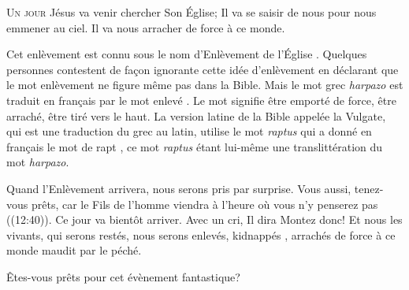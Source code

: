 



\lettrine{U}{n jour} Jésus va venir chercher Son Église;
 Il va se saisir de nous pour nous emmener au ciel.
 Il va nous arracher de force à ce monde.

Cet enlèvement est connu sous le nom \Og d'Enlèvement de l'Église \Fg{}.
 Quelques personnes contestent de fa\c{c}on ignorante cette idée d'enlèvement
 en déclarant que le mot \Og enlèvement \Fg{} ne figure même pas dans la Bible.
 Mais le mot grec \emph{harpazo} est traduit en fran\c{c}ais
 par le mot \Og enlevé \Fg{}. Le mot signifie \Og être emporté de force,
 être arraché, être tiré vers le haut. \Fg{}
 La version latine de la Bible appelée la Vulgate, qui est une traduction
 du grec au latin,  utilise
 le mot \emph{raptus} qui a donné en fran\c{c}ais le mot de \Og rapt \Fg{},
 ce mot \emph{raptus} étant lui-même une translittération du mot \emph{harpazo}. 


Quand l'Enlèvement arrivera, nous serons pris par surprise.
 \Og Vous aussi, tenez-vous prêts, car le Fils de l'homme viendra à l'heure
 où vous n'y penserez pas \Fg{}  ((12:40)).
 Ce jour va bientôt arriver. Avec un cri, Il dira\frcolon{} 
 \Og Montez donc! \Fg{} Et nous les vivants, qui serons restés,
 nous serons enlevés, \Og kidnappés \Fg{}, arrachés de force
 à ce monde maudit par le péché.

Êtes-vous prêts pour cet évènement fantastique?

\dvrule



